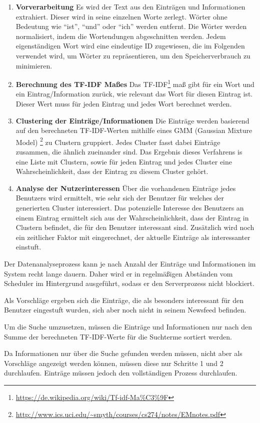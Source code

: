 		\begin{enumerate}
			\item \textbf{Vorverarbeitung} Es wird der Text aus den Einträgen und Informationen extrahiert. Dieser wird in seine einzelnen Worte zerlegt. Wörter ohne Bedeutung wie \enquote{ist}, \enquote{und} oder \enquote{ich} werden entfernt. Die Wörter werden normalisiert, indem die Wortendungen abgeschnitten werden. Jedem eigenständigen Wort wird eine eindeutige ID zugewiesen, die im Folgenden verwendet wird, um Wörter zu repräsentieren, um den Speicherverbrauch zu minimieren.

			\item \textbf{Berechnung des TF-IDF Maßes} Das TF-IDF\footnote{\url{https://de.wikipedia.org/wiki/Tf-idf-Ma\%C3\%9F}} maß gibt für ein Wort und ein Eintrag/Information zurück, wie relevant das Wort für diesen Eintrag ist. Dieser Wert muss für jeden Eintrag und jedes Wort berechnet werden.

			\item \textbf{Clustering der Einträge/Informationen} Die Einträge werden basierend auf den berechneten TF-IDF-Werten mithilfe eines GMM (Gaussian Mixture Model) \footnote{\url{http://www.ics.uci.edu/~smyth/courses/cs274/notes/EMnotes.pdf}} zu Clustern gruppiert. Jedes Cluster fasst dabei Einträge zusammen, die ähnlich zueinander sind. Das Ergebnis dieses Verfahrens is eine Liste mit Clustern, sowie für jeden Eintrag und jedes Cluster eine Wahrscheinlichkeit, dass der Eintrag zu diesem Cluster gehört.

			\item \textbf{Analyse der Nutzerinteressen} Über die vorhandenen Einträge jedes Benutzers wird ermittelt, wie sehr sich der Benutzer für welches der generierten Cluster interessiert. Das potenzielle Interesse des Benutzers an einem Eintrag ermittelt sich aus der Wahrscheinlichkeit, dass der Eintrag in Clustern befindet, die für den Benutzer interessant sind. Zusätzlich wird noch ein zeitlicher Faktor mit eingerechnet, der aktuelle Einträge als interessanter einstuft.
		\end{enumerate}

		Der Datenanalyseprozess kann je nach Anzahl der Einträge und Informationen im System recht lange dauern. Daher wird er in regelmäßigen Abständen vom Scheduler im Hintergrund ausgeführt, sodass er den Serverprozess nicht blockiert.

		Als Vorschläge ergeben sich die Einträge, die als besonders interessant für den Benutzer eingestuft wurden, sich aber noch nicht in seinem Newsfeed befinden.

		Um die Suche umzusetzen, müssen die Einträge und Informationen nur nach den Summe der berechneten TF-IDF-Werte für die Suchterme sortiert werden.

		Da Informationen nur über die Suche gefunden werden müssen, nicht aber als Vorschläge angezeigt werden können, müssen diese nur Schritte 1 und 2 durchlaufen. Einträge müssen jedoch den vollständigen Prozess durchlaufen.

